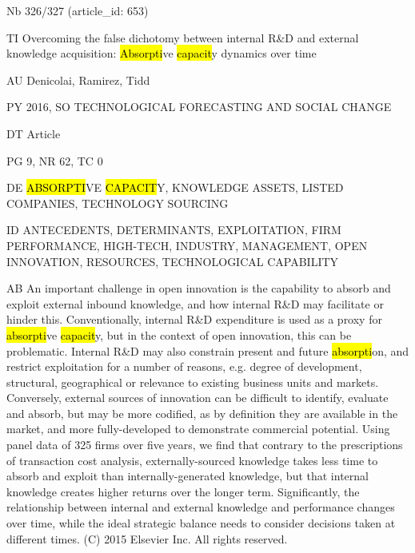 \documentclass[a4paper]{article}
\begin{document}
\vspace*{-2cm}
Nb \tabto{0cm}326/327 (article\_id: 653)\par
TI \tabto{0cm}Overcoming the false dichotomy between internal R\&D and external knowledge acquisition: \hl{Absorpti}ve \hl{capacit}y dynamics over time\par
AU \tabto{0cm}Denicolai, Ramirez, Tidd\par
PY \tabto{0cm}2016, SO TECHNOLOGICAL FORECASTING AND SOCIAL CHANGE\par
DT \tabto{0cm}Article\par
PG \tabto{0cm}9, NR 62, TC 0\par
DE \tabto{0cm}\hl{ABSORPTI}VE \hl{CAPACIT}Y, KNOWLEDGE ASSETS, LISTED COMPANIES, TECHNOLOGY SOURCING\par
ID \tabto{0cm}ANTECEDENTS, DETERMINANTS, EXPLOITATION, FIRM PERFORMANCE, HIGH-TECH, INDUSTRY, MANAGEMENT, OPEN INNOVATION, RESOURCES, TECHNOLOGICAL CAPABILITY\par
AB \tabto{0cm}An important challenge in open innovation is the capability to absorb and exploit external inbound knowledge, and how internal R\&D may facilitate or hinder this. Conventionally, internal R\&D expenditure is used as a proxy for \hl{absorpti}ve \hl{capacit}y, but in the context of open innovation, this can be problematic. Internal R\&D may also constrain present and future \hl{absorpti}on, and restrict exploitation for a number of reasons, e.g. degree of development, structural, geographical or relevance to existing business units and markets. Conversely, external sources of innovation can be difficult to identify, evaluate and absorb, but may be more codified, as by definition they are available in the market, and more fully-developed to demonstrate commercial potential. Using panel data of 325 firms over five years, we find that contrary to the prescriptions of transaction cost analysis, externally-sourced knowledge takes less time to absorb and exploit than internally-generated knowledge, but that internal knowledge creates higher returns over the longer term. Significantly, the relationship between internal and external knowledge and performance changes over time, while the ideal strategic balance needs to consider decisions taken at different times. (C) 2015 Elsevier Inc. All rights reserved.\par
\clearpage
\end{document}
